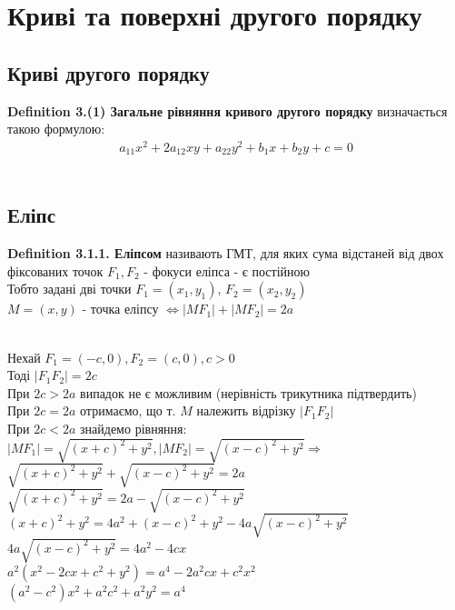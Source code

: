 \documentclass[a4paper, 14pt]{extarticle}
\def\defin#1{\textbf{Definition {#1}}}
\def\bigline{\vspace{5mm}\\}
\begin{document}
\section{Криві та поверхні другого порядку}
\subsection*{Криві другого порядку}
\defin{3.(1) Загальне рівняння кривого другого порядку} визначається такою формулою:
\begin{align*}
a_{11}x^2 + 2a_{12}xy + a_{22}y^2 + b_1x+b_2y+c=0
\end{align*}
\\
\subsection{Еліпс}
\defin{3.1.1. Еліпсом} називають ГМТ, для яких сума відстаней від двох фіксованих точок $F_1,F_2$ - фокуси еліпса - є постійною
\bigline
Тобто задані дві точки $F_1 = (x_1,y_1)$, $F_2 = (x_2,y_2)$\\
$M = (x,y)$ - точка еліпсу $\iff |MF_1|+|MF_2| = 2a$\\
\\
Нехай $F_1 = (-c,0), F_2 = (c,0), c > 0$\\
Тоді $|F_1F_2|=2c$\\
При $2c > 2a$ випадок не є можливим (нерівність трикутника підтвердить)\\
При $2c = 2a$ отримаємо, що т. $M$ належить відрізку $|F_1F_2|$\\
При $2c < 2a$ знайдемо рівняння:\\
$|MF_1|=\sqrt{(x+c)^2+y^2}, |MF_2|=\sqrt{(x-c)^2+y^2} \Rightarrow$\\
$\sqrt{(x+c)^2+y^2} + \sqrt{(x-c)^2+y^2} = 2a$\\
$\sqrt{(x+c)^2+y^2} = 2a - \sqrt{(x-c)^2+y^2}$\\
$(x+c)^2+y^2=4a^2+(x-c)^2+y^2-4a\sqrt{(x-c)^2+y^2}$\\
$4a\sqrt{(x-c)^2+y^2} = 4a^2 -4cx$\\
$a^2(x^2-2cx+c^2+y^2)=a^4-2a^2cx+c^2x^2$\\
$(a^2-c^2)x^2+a^2c^2+a^2y^2=a^4$\\
\end{document}
